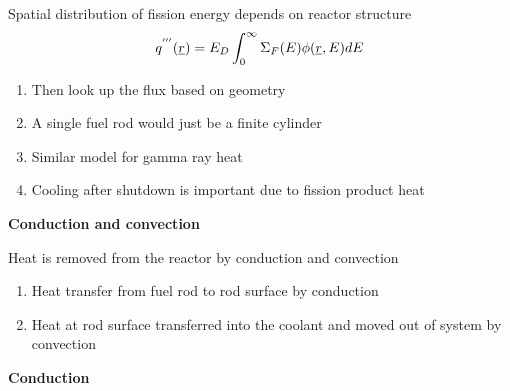 \documentclass[aspectratio=1610,pdftex,dvipsnames,compress,xcolor={dvipsnames}]{beamer}
\begin{document}
\begin{frame}{Spatial distribution of fission energy depends on reactor structure}
    \begin{equation}
        \LARGE
        q^{'''}(\underline{r}) = E_D \int_0^{\infty} \Sigma_F(E) \phi(\underline{r},E) dE
    \end{equation}

    \vspace*{\fill}

    \begin{enumerate}[series=outerlist,topsep=0pt,itemsep=21pt,leftmargin=*,label=(\arabic*)]
        \item[]Then look up the flux based on geometry
        \item[]A single fuel rod would just be a finite cylinder
        \item[]Similar model for gamma ray heat
        \item[]Cooling after shutdown is important due to fission product heat
    \end{enumerate}
\end{frame}


\begin{frame}[plain]{}
    \centering\LARGE\textbf{Conduction and convection}
\end{frame}


\addtocounter{framenumber}{-1} 
\begin{frame}{Heat is removed from the reactor by conduction and convection}
    \begin{enumerate}[series=outerlist,topsep=0pt,itemsep=21pt,leftmargin=*,label=(\arabic*)]
        \item[]Heat transfer from fuel rod to rod surface by conduction
        \item[]Heat at rod surface transferred into the coolant and moved out of system by convection
    \end{enumerate}
\end{frame}


\begin{frame}[plain]{}
    \centering\LARGE\textbf{Conduction}
\end{frame}
\end{document}
